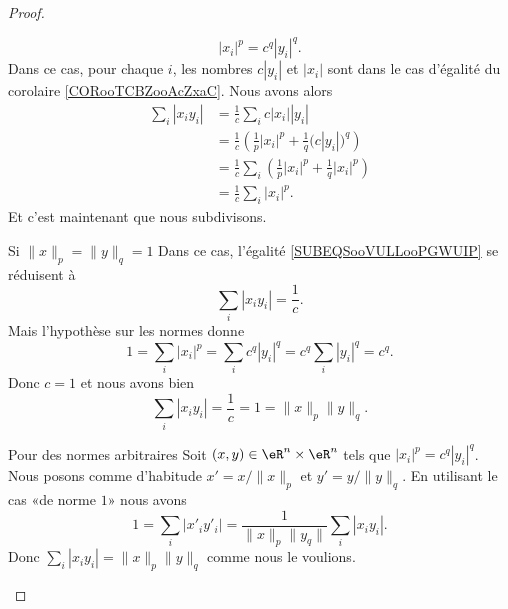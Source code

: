 \begin{proof}
\begin{subproof}
            \begin{equation}
                | x_i |^p=c^q| y_i |^q.
            \end{equation}
            Dans ce cas, pour chaque \( i\), les nombres \( c| y_i |\) et \( | x_i |\) sont dans le cas d'égalité du corolaire \ref{CORooTCBZooAcZxaC}. Nous avons alors
            \begin{subequations}        \label{SUBEQSooVULLooPGWUIP}
                \begin{align}
                    \sum_i| x_iy_i |  & =\frac{1}{ c }\sum_ic| x_i | |y_i |\\
                                      & =\frac{1}{ c }\left( \frac{1}{ p }| x_i |^p+\frac{1}{ q }\big( c| y_i | \big)^q \right)\\
                                      & =\frac{1}{ c }\sum_i\left( \frac{1}{ p }| x_i |^p+\frac{1}{ q }| x_i |^p \right)\\
                                      & =\frac{1}{ c }\sum_i| x_i |^p.
                \end{align}
            \end{subequations}
            Et c'est maintenant que nous subdivisons.
            \begin{subproof}
                \item[Si \( \| x \|_p=\| y \|_q=1\)]
                    Dans ce cas, l'égalité \eqref{SUBEQSooVULLooPGWUIP} se réduisent à
                    \begin{equation}
                        \sum_i| x_iy_i |=\frac{1}{ c }.
                    \end{equation}
                    Mais l'hypothèse sur les normes donne
                    \begin{equation}
                        1=\sum_i| x_i |^p=\sum_ic^q| y_i |^q=c^q\sum_i| y_i |^q=c^q.
                    \end{equation}
                    Donc \( c=1\) et nous avons bien
                    \begin{equation}
                        \sum_i| x_iy_i |=\frac{1}{ c }=1=\| x \|_p\| y \|_q.
                    \end{equation}
                \item[Pour des normes arbitraires]
                    Soit \( (x,y)\in \eR^n\times \eR^n\) tels que \( | x_i |^p=c^q| y_i |^q\). Nous posons comme d'habitude \( x'=x/\| x \|_p\) et \( y'=y/\| y \|_q\). En utilisant le cas «de norme \( 1\)» nous avons
                    \begin{equation}
                        1=\sum_i| x'_iy'_i |=\frac{1}{ \| x \|_p\| y_q \| }\sum_i| x_iy_i |.
                    \end{equation}
                    Donc \( \sum_i| x_iy_i |=\| x \|_p\| y \|_q\) comme nous le voulions.
            \end{subproof}
    \end{subproof}
\end{proof}

